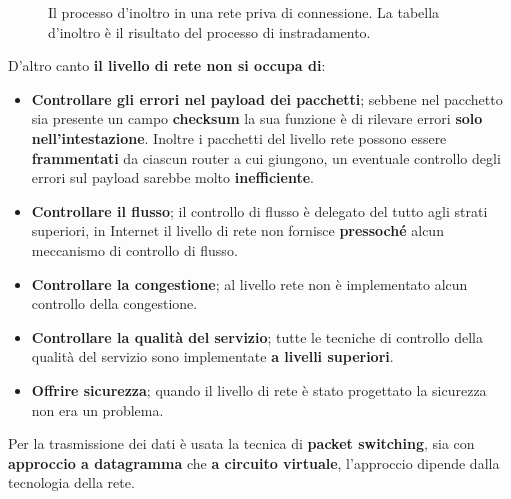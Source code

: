 \documentclass[11pt,a4paper,oneside]{book}
\theoremstyle{definition}
\begin{document}
\begin{itemize}
\begin{figure}[!h]
		      \centering
		      \caption{Il processo d'inoltro in una rete priva di connessione. La tabella d'inoltro è il risultato del processo di instradamento.}
	      \end{figure}
\end{itemize}
D'altro canto \textbf{il livello di rete non si occupa di}:
\begin{itemize}
	\item \textbf{Controllare gli errori nel payload dei pacchetti}; sebbene nel pacchetto sia presente un campo \textbf{checksum} la sua funzione è di rilevare errori \textbf{solo nell'intestazione}.
	      Inoltre i pacchetti del livello rete possono essere \textbf{frammentati} da ciascun router a cui giungono, un eventuale controllo degli errori sul payload sarebbe molto \textbf{inefficiente}.
	\item \textbf{Controllare il flusso}; il controllo di flusso è delegato del tutto agli strati superiori, in Internet il livello di rete non fornisce \textbf{pressoché} alcun meccanismo di controllo di flusso.
	\item \textbf{Controllare la congestione}; al livello rete non è implementato alcun controllo della congestione.
	\item \textbf{Controllare la qualità del servizio}; tutte le tecniche di controllo della qualità del servizio sono implementate \textbf{a livelli superiori}.
	\item \textbf{Offrire sicurezza}; quando il livello di rete è stato progettato la sicurezza non era un problema.
\end{itemize}
Per la trasmissione dei dati è usata la tecnica di \textbf{packet switching}, sia con \textbf{approccio a datagramma} che \textbf{a circuito virtuale}, l'approccio dipende dalla tecnologia della rete.
\end{document}
